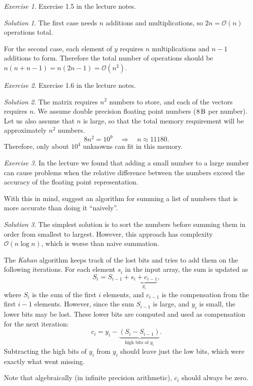 \documentclass[onecolumn, oneside, a4paper, 11pt]{memoir}
\theoremstyle{remark}
\newtheorem{ex}{Exercise}
\newtheorem*{sol}{Solution}
\begin{document}
\begin{ex}
  Exercise 1.5 in the lecture notes.
\end{ex}
\begin{sol}
  The first case needs $n$ additions and multiplications, so $2n =
  \mathcal{O}(n)$ operations total.

  For the second case, each element of $y$ requires $n$ multiplications and
  $n-1$ additions to form. Therefore the total number of operations should be
  $n(n + n - 1) = n(2n-1) = \mathcal{O}(n^2)$.
\end{sol}

\begin{ex}
  Exercise 1.6 in the lecture notes.
\end{ex}
\begin{sol}
  The matrix requires $n^2$ numbers to store, and each of the vectors requires
  $n$. We assume double precision floating point numbers ($\SI{8}{\byte}$ per
  number). Let us also assume that $n$ is large, so that the total memory
  requirement will be approximately $n^2$ numbers.
  \[
    8n^2 = 10^9 \quad\Longrightarrow\quad n \approx 11180.
  \]
  Therefore, only about $10^4$ unknowns can fit in this memory.
\end{sol}

\begin{ex}
  In the lecture we found that adding a small number to a large number can cause
  problems when the relative difference between the numbers exceed the accuracy
  of the floating point representation.

  With this in mind, suggest an algorithm for summing a list of numbers that is
  more accurate than doing it ``naively''.
\end{ex}
\begin{sol}
  The simplest solution is to sort the numbers before summing them in order from
  smallest to largest. However, this approach has complexity $\mathcal{O}(n\log
  n)$, which is worse than naive summation.

  The \emph{Kahan} algorithm keeps track of the lost bits and tries to add them
  on the following iterations. For each element $s_i$ in the input array, the
  sum is updated as
  \[
    S_i = S_{i-1} + \underbrace{s_i + c_{i-1}}_{y_i},
  \]
  where $S_i$ is the sum of the first $i$ elements, and $c_{i-1}$ is the
  compensation from the first $i-1$ elements. However, since the sum $S_{i-1}$
  is large, and $y_i$ is small, the lower bits may be lost. These lower bits are
  computed and used as compensation for the next iteration:
  \[
    c_i = y_i - \underbrace{(S_i - S_{i-1})}_{\text{high bits of $y_i$}}.
  \]
  Subtracting the high bits of $y_i$ from $y_i$ should leave just the low bits,
  which were exactly what went missing.

  Note that algebraically (in infinite precision arithmetic), $c_i$ should
  always be zero.
\end{sol}
\end{document}
